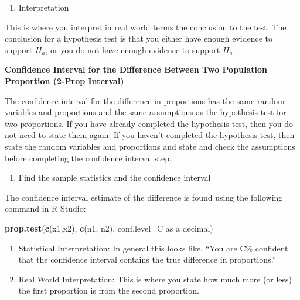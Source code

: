 \documentclass[
]{book}
\newenvironment{Shaded}{\begin{snugshade}}{\end{snugshade}}
\newcommand{\DataTypeTok}[1]{\textcolor[rgb]{0.13,0.29,0.53}{#1}}
\newcommand{\KeywordTok}[1]{\textcolor[rgb]{0.13,0.29,0.53}{\textbf{#1}}}
\newcommand{\NormalTok}[1]{#1}
\providecommand{\tightlist}{%
  \setlength{\itemsep}{0pt}\setlength{\parskip}{0pt}}
\begin{document}
\begin{enumerate}
\def\labelenumi{\arabic{enumi}.}
\setcounter{enumi}{5}
\tightlist
\item
  Interpretation
\end{enumerate}

This is where you interpret in real world terms the conclusion to the test. The conclusion for a hypothesis test is that you either have enough evidence to support \(H_a\), or you do not have enough evidence to support \(H_a\).

\textbf{Confidence Interval for the Difference Between Two Population Proportion (2-Prop Interval)}

The confidence interval for the difference in proportions has the same random variables and proportions and the same assumptions as the hypothesis test for two proportions. If you have already completed the hypothesis test, then you do not need to state them again. If you haven't completed the hypothesis test, then state the random variables and proportions and state and check the assumptions before completing the confidence interval step.

\begin{enumerate}
\def\labelenumi{\arabic{enumi}.}
\tightlist
\item
  Find the sample statistics and the confidence interval
\end{enumerate}

The confidence interval estimate of the difference is found using the following command in R Studio:

\begin{Shaded}
\begin{Highlighting}[]
\KeywordTok{prop.test}\NormalTok{(}\KeywordTok{c}\NormalTok{(x1,x2), }\KeywordTok{c}\NormalTok{(n1, n2), }\DataTypeTok{conf.level=}\NormalTok{C as a decimal)}
\end{Highlighting}
\end{Shaded}

\begin{enumerate}
\def\labelenumi{\arabic{enumi}.}
\setcounter{enumi}{1}
\item
  Statistical Interpretation: In general this looks like, ``You are C\% confident that the confidence interval contains the true difference in proportions.''
\item
  Real World Interpretation: This is where you state how much more (or less) the first proportion is from the second proportion.
\end{enumerate}
\end{document}
